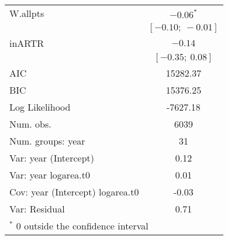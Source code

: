 \documentclass[11pt]{article}
\begin{document}
\begin{table}
\begin{center}
\begin{tabular}{l c }
W.allpts                         & $-0.06^{*}$       \\
                                 & $[-0.10;\ -0.01]$ \\
inARTR                           & $-0.14$           \\
                                 & $[-0.35;\ 0.08]$  \\
\hline
AIC                              & 15282.37          \\
BIC                              & 15376.25          \\
Log Likelihood                   & -7627.18          \\
Num. obs.                        & 6039              \\
Num. groups: year                & 31                \\
Var: year (Intercept)            & 0.12              \\
Var: year logarea.t0             & 0.01              \\
Cov: year (Intercept) logarea.t0 & -0.03             \\
Var: Residual                    & 0.71              \\
\hline
\multicolumn{2}{l}{\scriptsize{$^*$ 0 outside the confidence interval}}
\end{tabular}
\label{table:PSSPgrowth-inARTR}
\end{center}
\end{table}
\end{document}
